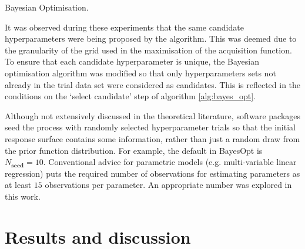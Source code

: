 \begin{algorithm}\label{alg:bayes_opt}
\BlankLine
{}
\caption{Bayesian Optimisation.}
\end{algorithm}

It was observed during these experiments that the same candidate hyperparameters were being proposed by the algorithm. This was deemed due to the granularity of the grid used in the maximisation of the acquisition function. To ensure that each candidate hyperparameter is unique, the Bayesian optimisation algorithm was modified so that only  hyperparameters sets not already in the trial data set were considered as candidates. This is reflected in the conditions on the `select candidate' step of algorithm \ref{alg:bayes_opt}.

Although not extensively discussed in the theoretical literature, software packages seed the process with randomly selected hyperparameter trials so that the initial response surface contains some information, rather than just a random draw from the prior function distribution. For example, the default in BayesOpt \cite{martinez-cantinBayesOptBayesianOptimization2014} is $N_{\mathbf{seed}} = 10$. Conventional advice \cite{harrelRegressionModelingStrategies2015} for parametric models (e.g. multi-variable linear regression) puts the required number of observations for estimating parameters as at least $15$ observations per parameter. An appropriate number was explored in this work. 


\section{Results and discussion}\label{sec:msm_results}
